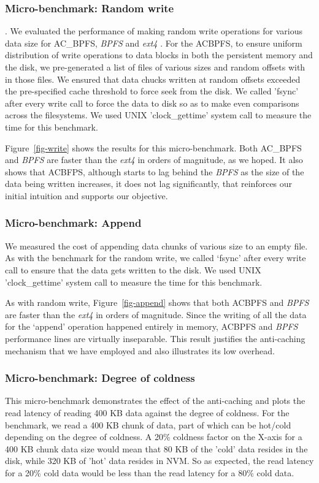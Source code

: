 \subsubsection{Micro-benchmark: Random write}
. We evaluated the performance of making random write operations for various data size for AC\_BPFS, \textit{BPFS} and  \textit{ext4} . For the AC\-BPFS, to ensure uniform distribution of write operations to data blocks in both the persistent memory and the disk, we pre-generated a list of files of various sizes and random offsets with in those files. We ensured that data chucks written at random offsets exceeded the pre-specified cache threshold to force seek from the disk. We called 'fsync' after every write call to force the data to disk so as to make even comparisons across the filesystems. We used UNIX 'clock\_gettime' system call to measure the time for this benchmark.

Figure~\ref{fig-write} shows the results for this micro-benchmark. Both AC\_BPFS and \textit{BPFS} are faster than the  \textit{ext4}  in orders of magnitude, as we hoped. It also shows that AC\-BFPS, although starts to lag behind the \textit{BPFS} as the size of the data being written increases, it does not lag significantly, that reinforces our initial intuition and supports our objective.



\subsubsection{Micro-benchmark: Append}
We measured the cost of appending data chunks of various size to an empty file. As with the benchmark for the random write, we called ‘fsync’ after every write call to ensure that the data gets written to the disk. We used UNIX 'clock\_gettime' system call to measure the time for this benchmark.

As with random write, Figure~\ref{fig-append}  shows that both AC\-BPFS and \textit{BPFS} are faster than the  \textit{ext4}  in orders of magnitude. Since the writing of all the data for the ‘append’ operation happened entirely in memory, AC\-BPFS and \textit{BPFS} performance lines are virtually inseparable. This result justifies the anti-caching mechanism that we have employed and also illustrates its low overhead.


\subsubsection{Micro-benchmark: Degree of coldness}
This micro-benchmark demonstrates the effect of the anti-caching and plots the read latency of reading 400 KB data against the degree of coldness. For the benchmark, we read a 400 KB chunk of data, part of which can be hot/cold depending on the degree of coldness. A 20\% coldness factor on the X-axis for a 400 KB chunk data size would mean that 80 KB of the 'cold' data resides in the disk, while 320 KB of 'hot' data resides in NVM. So as expected, the read latency for a 20\% cold data would be less than the read latency for a 80\% cold data.\\

